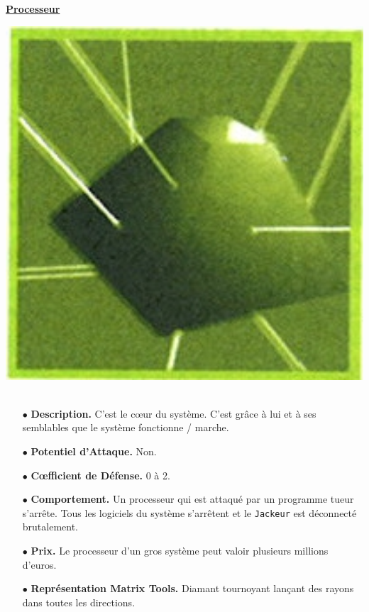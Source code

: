 \documentclass[11pt,twoside,a4paper]{article}
\begin{document}
\begin{multicols*}{2}
\underline{\textbf{Processeur}} ~\\
\begin{minipage}[h]{0.12\textwidth}
	\includegraphics[width=1.20\textwidth]{img/catalogueProgrammesProcesseur.jpg}~\\
\end{minipage} \hfill \begin{minipage}[h]{0.37\textwidth}
	\begin{itemize}
		\item[$\bullet$] \textbf{Description. } C'est le c\oe ur du syst{\`e}me. C'est gr{\^a}ce {\`a} lui et {\`a} ses semblables que le syst{\`e}me fonctionne / marche.
		\item[$\bullet$] \textbf{Potentiel d'Attaque. }Non. 
		\item[$\bullet$] \textbf{C\oe fficient de D{\'e}fense. }0 {\`a} 2.  
	\end{itemize}
\end{minipage}
\begin{itemize} 
	\item[$\bullet$] \textbf{Comportement. }Un processeur qui est attaqu{\'e} par un programme tueur s'arr{\^e}te. Tous les logiciels du syst{\`e}me s'arr{\^e}tent et le \texttt{Jackeur} est d{\'e}connect{\'e} brutalement. 
	\item[$\bullet$] \textbf{Prix. }Le processeur d'un gros syst{\`e}me peut valoir plusieurs millions d'euros. 
	\item[$\bullet$] \textbf{Repr{\'e}sentation Matrix Tools. }Diamant tournoyant lan\c{c}ant des rayons dans toutes les directions. 
\end{itemize} %


\end{multicols*}
\end{document}
